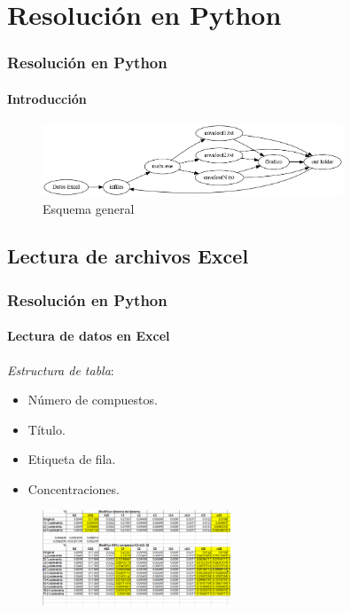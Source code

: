 \documentclass[aspectratio=1610,multi,rgb]{beamer}
\begin{document}
\section{Resolución en Python}
\begin{frame}[c]
    \frametitle{Resolución en Python}
    \framesubtitle{Introducción}
    \begin{figure}[htpb]
        \centering
        \includegraphics[width=0.8\textwidth]{figs/script.png}
        \caption{Esquema general}
        \label{fig:}
    \end{figure}
\end{frame}


\subsection{Lectura de archivos Excel}

\begin{frame}[c]
    \frametitle{Resolución en Python}
    \framesubtitle{Lectura de datos en Excel}
    \textit{Estructura de tabla}:
    \begin{itemize}
        \item Número de compuestos.
        \item Título.
        \item Etiqueta de fila.
        \item Concentraciones.
    \end{itemize}

    \begin{figure}[htpb]
        \centering
        \includegraphics[width=0.5\textwidth]{figs/excel.png}
        \caption{}
        \label{fig:figs-excel-png}
    \end{figure}
\end{frame}
\end{document}
